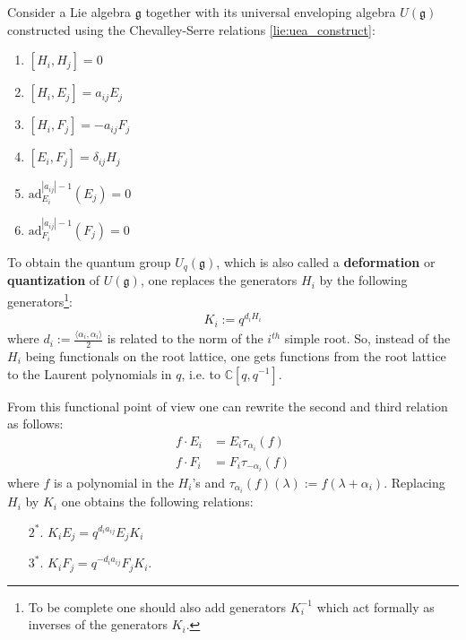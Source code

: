     \begin{construct}
        Consider a Lie algebra $\mathfrak{g}$ together with its universal enveloping algebra $U(\mathfrak{g})$ constructed using the Chevalley-Serre relations \ref{lie:uea_construct}:
        \begin{enumerate}
            \item $[H_i, H_j] = 0$
                \item $[H_i, E_j] = a_{ij}E_j$
                \item $[H_i, F_j] = -a_{ij}F_j$
            \item $[E_i, F_j] = \delta_{ij}H_j$
                \item $\text{ad}_{E_i}^{|a_{ij}|-1}(E_j) = 0$
                \item $\text{ad}_{F_i}^{|a_{ij}|-1}(F_j) = 0$
        \end{enumerate}
         To obtain the quantum group $U_q(\mathfrak{g})$, which is also called a \textbf{deformation} or \textbf{quantization} of $U(\mathfrak{g})$, one replaces the generators $H_i$ by the following generators\footnote{To be complete one should also add generators $K_i^{-1}$ which act formally as inverses of the generators $K_i$.}:
        \begin{gather}
            K_i := q^{d_iH_i}
        \end{gather}
        where $d_i := \frac{\langle\alpha_i, \alpha_i\rangle}{2}$ is related to the norm of the $i^{th}$ simple root. So, instead of the $H_i$ being functionals on the root lattice, one gets functions from the root lattice to the Laurent polynomials in $q$, i.e. to $\mathbb{C}[q, q^{-1}]$.

        From this functional point of view one can rewrite the second and third relation as follows:
        \begin{align*}
            f\cdot E_i &= E_i\tau_{\alpha_i}(f)\\
            f\cdot F_i &= F_i\tau_{-\alpha_i}(f)
        \end{align*}
        where $f$ is a polynomial in the $H_i$'s and $\tau_{\alpha_i}(f)(\lambda) := f(\lambda+\alpha_i)$. Replacing $H_i$ by $K_i$ one obtains the following relations:
        \begin{enumerate}
            \item[$2^*.$] $K_iE_j = q^{d_ia_{ij}}E_jK_i$
            \item[$3^*.$] $K_iF_j = q^{-d_ia_{ij}}F_jK_i$.
        \end{enumerate}


\end{construct}
